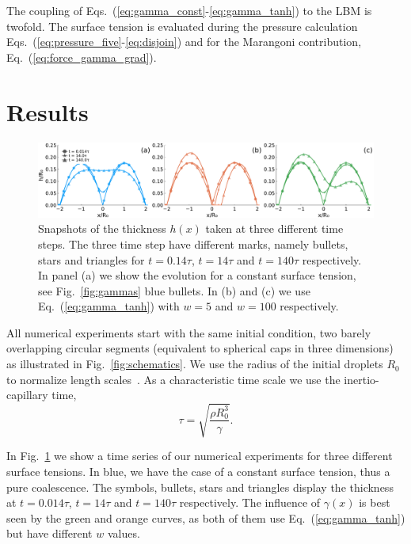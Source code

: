 The coupling of Eqs.~(\ref{eq:gamma_const}-\ref{eq:gamma_tanh}) to the LBM is twofold.
The surface tension is evaluated during the pressure calculation Eqs.~(\ref{eq:pressure_five}-\ref{eq:disjoin}) and for the Marangoni contribution, Eq.~(\ref{eq:force_gamma_grad}).

\section{Results}\label{sec:results_five}
\begin{figure}
    \centering
    \includegraphics[width=1.0\textwidth]{graphics/height_three_times_three_gamma.pdf}
    \caption{Snapshots of the thickness $h(x)$ taken at three different time steps.
    The three time step have different marks, namely bullets, stars and triangles for $t=0.14\tau$, $t=14\tau$ and $t=140\tau$ respectively.
    In panel (a) we show the evolution for a constant surface tension, see Fig.~\ref{fig:gammas} blue bullets.
    In (b) and (c) we use Eq.~(\ref{eq:gamma_tanh}) with $w =5$ and $w=100$ respectively. 
    }
    \label{fig:final_state}
\end{figure}
All numerical experiments start with the same initial condition, two barely overlapping circular segments (equivalent to spherical caps in three dimensions) as illustrated in Fig.~\ref{fig:schematics}.
We use the radius of the initial droplets $R_0$ to normalize length scales~\cite{PhysRevLett.111.144502, PhysRevLett.95.164503}.
As a characteristic time scale we use the inertio-capillary time, 
\begin{equation}\label{eq:inertio-cap-time}
    \tau = \sqrt{\frac{\rho R_0^3}{\gamma}}.
\end{equation}

In Fig.~\ref{fig:final_state} we show a time series of our numerical experiments for three different surface tensions.
In blue, we have the case of a constant surface tension, thus a pure coalescence.
The symbols, bullets, stars and triangles display the thickness at $t=0.014\tau$, $t=14\tau$ and $t=140\tau$ respectively. 
The influence of $\gamma(x)$ is best seen by the green and orange curves, as both of them use Eq.~(\ref{eq:gamma_tanh}) but have different $w$ values.

